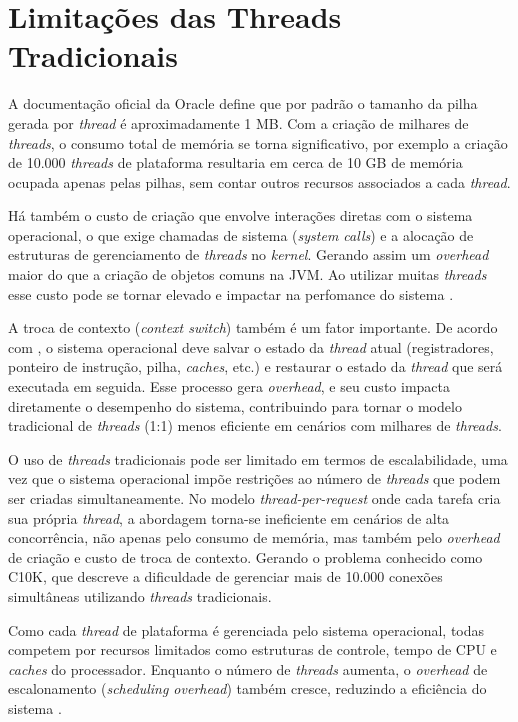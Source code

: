 \documentclass[12pt, openright, oneside, a4paper, english,	french,	spanish, brazil	]{abntex2}
\begin{document}
 
    \section{Limitações das Threads Tradicionais}

    A documentação oficial da Oracle \cite{oracleJVMOptions} define que por padrão o tamanho da pilha gerada por \textit{thread} é aproximadamente 1 MB. Com a criação de milhares de \textit{threads}, o consumo total de memória se torna significativo, por exemplo a criação de 10.000 \textit{threads} de plataforma resultaria em cerca de 10 GB de memória ocupada apenas pelas pilhas, sem contar outros recursos associados a cada \textit{thread}.

    Há também o custo de criação que envolve interações diretas com o sistema operacional, o que exige chamadas de sistema (\textit{system calls}) e a alocação de estruturas de gerenciamento de \textit{threads} no \textit{kernel}. Gerando assim um \textit{overhead} maior do que a criação de objetos comuns na JVM. Ao utilizar muitas \textit{threads} esse custo pode se tornar elevado e impactar na perfomance do sistema \cite{oracleJVMOptions}.

    A troca de contexto (\textit{context switch}) também é um fator importante. De acordo com , o sistema operacional deve salvar o estado da \textit{thread} atual (registradores, ponteiro de instrução, pilha, \textit{caches}, etc.) e restaurar o estado da \textit{thread} que será executada em seguida. Esse processo gera \textit{overhead}, e seu custo impacta diretamente o desempenho do sistema, contribuindo para tornar o modelo tradicional de \textit{threads} (1:1) menos eficiente em cenários com milhares de \textit{threads}.

    O uso de \textit{threads} tradicionais pode ser limitado em termos de escalabilidade, uma vez que o sistema operacional impõe restrições ao número de \textit{threads} que podem ser criadas simultaneamente. No modelo \textit{thread-per-request} onde cada tarefa cria sua própria \textit{thread}, a abordagem torna-se ineficiente em cenários de alta concorrência, não apenas pelo consumo de memória, mas também pelo \textit{overhead} de criação e custo de troca de contexto. Gerando o problema conhecido como C10K, que descreve a dificuldade de gerenciar mais de 10.000 conexões simultâneas utilizando \textit{threads} tradicionais. \cite{ck10Problem}

    Como cada \textit{thread} de plataforma é gerenciada pelo sistema operacional, todas competem por recursos limitados como estruturas de controle, tempo de CPU e \textit{caches} do processador. Enquanto o número de \textit{threads} aumenta, o \textit{overhead} de escalonamento (\textit{scheduling overhead}) também cresce, reduzindo a eficiência do sistema \cite{tanenbaum2015}.
\end{document}
